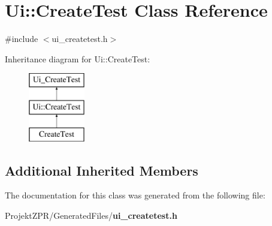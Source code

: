 \section{Ui\-:\-:Create\-Test Class Reference}
\label{class_ui_1_1_create_test}


{\ttfamily \#include $<$ui\-\_\-createtest.\-h$>$}

Inheritance diagram for Ui\-:\-:Create\-Test\-:\begin{figure}[H]
\begin{center}
\leavevmode
\includegraphics[height=3.000000cm]{class_ui_1_1_create_test}
\end{center}
\end{figure}
\subsection*{Additional Inherited Members}


The documentation for this class was generated from the following file\-:\begin{DoxyCompactItemize}
\item 
Projekt\-Z\-P\-R/\-Generated\-Files/{\bf ui\-\_\-createtest.\-h}\end{DoxyCompactItemize}
